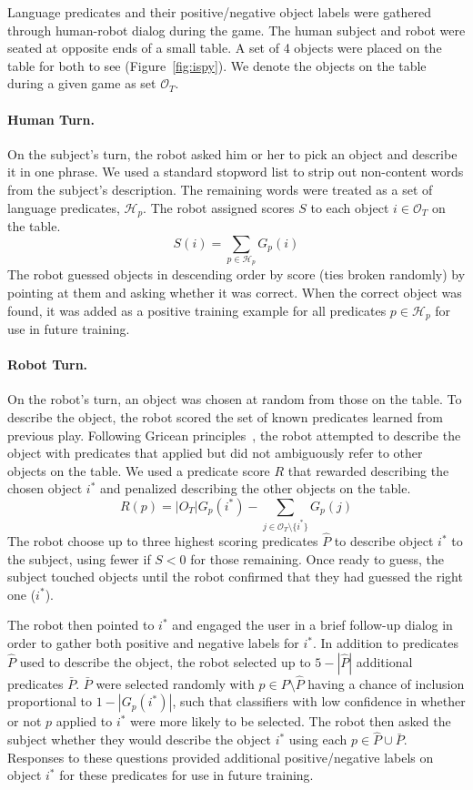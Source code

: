 Language predicates and their positive/negative object labels were gathered through human-robot dialog during the \ispy game.
The human subject and robot were seated at opposite ends of a small table.
A set of 4 objects were placed on the table for both to see (Figure~\ref{fig:ispy}).
We denote the objects on the table during a given game as set $\mathcal{O}_T$.

\paragraph{Human Turn.} On the subject's turn, the robot asked him or her to pick an object and describe it in one phrase.
We used a standard stopword list to strip out non-content words from the subject's description.
The remaining words were treated as a set of language predicates, $\mathcal{H}_p$.
The robot assigned scores $S$ to each object $i\in \mathcal{O}_T$ on the table.
\begin{equation}
	S(i) = \sum_{p\in \mathcal{H}_p}{G_p(i)}
\end{equation}
The robot guessed objects in descending order by score (ties broken randomly) by pointing at them and asking whether it was correct.
When the correct object was found, it was added as a positive training example for all predicates $p\in \mathcal{H}_p$ for use in future training.

\paragraph{Robot Turn.} On the robot's turn, an object was chosen at random from those on the table.
To describe the object, the robot scored the set of known predicates learned from previous play.
Following Gricean principles~\cite{grice:bkchapter75}, the robot attempted to describe the object with predicates that applied but did not ambiguously refer to other objects on the table.
We used a predicate score $R$ that rewarded describing the chosen object $i^*$ and penalized describing the other objects on the table.
\begin{equation}
	R(p) = |O_T|G_p(i^*) - \sum_{j\in{\mathcal{O}_T}\setminus\{i^*\}}{G_p(j)}
\end{equation}
The robot choose up to three highest scoring predicates $\hat{P}$ to describe object $i^*$ to the subject, using fewer if $S<0$ for those remaining.
Once ready to guess, the subject touched objects until the robot confirmed that they had guessed the right one ($i^*$).

The robot then pointed to $i^*$ and engaged the user in a brief follow-up dialog in order to gather both positive and negative labels for $i^*$.
In addition to predicates $\hat{P}$ used to describe the object, the robot selected up to $5-|\hat{P}|$ additional predicates $\bar{P}$.
$\bar{P}$ were selected randomly with $p\in P\setminus\hat{P}$ having a chance of inclusion proportional to $1-|G_p(i^*)|$, such that classifiers with low confidence in whether or not $p$ applied to $i^*$ were more likely to be selected.
The robot then asked the subject whether they would describe the object $i^*$ using each $p\in\hat{P}\cup\bar{P}$.
Responses to these questions provided additional positive/negative labels on object $i^*$ for these predicates for use in future training.
